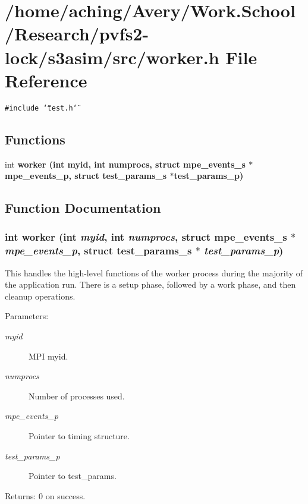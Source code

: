 \section{/home/aching/Avery/Work.School/Research/pvfs2-lock/s3asim/src/worker.h File Reference}
\label{worker_8h}
{\tt \#include \char`\"{}test.h\char`\"{}}\par
\subsection*{Functions}
\begin{CompactItemize}
\item 
int \bf{worker} (int myid, int numprocs, struct \bf{mpe\_\-events\_\-s} $\ast$mpe\_\-events\_\-p, struct \bf{test\_\-params\_\-s} $\ast$test\_\-params\_\-p)
\end{CompactItemize}


\subsection{Function Documentation}
\subsubsection{\setlength{\rightskip}{0pt plus 5cm}int worker (int {\em myid}, int {\em numprocs}, struct \bf{mpe\_\-events\_\-s} $\ast$ {\em mpe\_\-events\_\-p}, struct \bf{test\_\-params\_\-s} $\ast$ {\em test\_\-params\_\-p})}\label{worker_8h_015e5ab7dd7d165f8b2d73d73e3a1a41}


This handles the high-level functions of the worker process during the majority of the application run. There is a setup phase, followed by a work phase, and then cleanup operations.

\begin{Desc}
\item[Parameters:]
\begin{description}
\item[{\em myid}]MPI myid. \item[{\em numprocs}]Number of processes used. \item[{\em mpe\_\-events\_\-p}]Pointer to timing structure. \item[{\em test\_\-params\_\-p}]Pointer to test\_\-params. \end{description}
\end{Desc}
\begin{Desc}
\item[Returns:]0 on success. \end{Desc}
